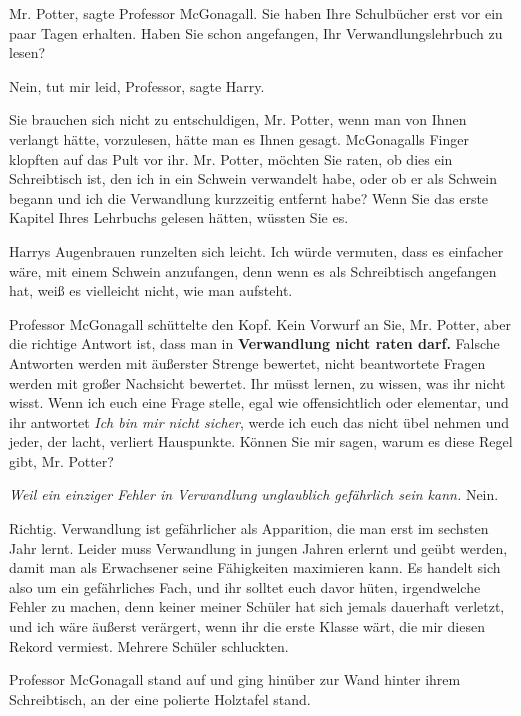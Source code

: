 \glqq{}Mr. Potter\grqq{}, sagte Professor McGonagall. \glqq{}Sie haben Ihre
Schulbücher erst vor ein paar Tagen erhalten. Haben Sie schon angefangen, Ihr
Verwandlungslehrbuch zu lesen?\grqq{}

\glqq{}Nein, tut mir leid, Professor\grqq{}, sagte Harry.

\glqq{}Sie brauchen sich nicht zu entschuldigen, Mr. Potter, wenn man von Ihnen
verlangt hätte, vorzulesen, hätte man es Ihnen gesagt.\grqq{} McGonagalls Finger
klopften auf das Pult vor ihr. \glqq{}Mr. Potter, möchten Sie raten, ob dies ein
Schreibtisch ist, den ich in ein Schwein verwandelt habe, oder ob er als Schwein
begann und ich die Verwandlung kurzzeitig entfernt habe? Wenn Sie das erste
Kapitel Ihres Lehrbuchs gelesen hätten, wüssten Sie es.\grqq{}

Harrys Augenbrauen runzelten sich leicht. \glqq{}Ich würde vermuten, dass es
einfacher wäre, mit einem Schwein anzufangen, denn wenn es als Schreibtisch
angefangen hat, weiß es vielleicht nicht, wie man aufsteht.\grqq{}

Professor McGonagall schüttelte den Kopf. \glqq{}Kein Vorwurf an Sie, Mr. Potter,
aber die richtige Antwort ist, dass man in \textbf{Verwandlung nicht raten
darf.} Falsche Antworten werden mit äußerster Strenge bewertet, nicht
beantwortete Fragen werden mit großer Nachsicht bewertet. Ihr müsst lernen, zu
wissen, was ihr nicht wisst. Wenn ich euch eine Frage stelle, egal wie
offensichtlich oder elementar, und ihr antwortet \emph{\glqq{}Ich bin mir nicht
sicher\grqq{}}, werde ich euch das nicht übel nehmen und jeder, der lacht,
verliert Hauspunkte. Können Sie mir sagen, warum es diese Regel gibt, Mr.
Potter?\grqq{}

\emph{Weil ein einziger Fehler in Verwandlung unglaublich gefährlich sein kann.}
\glqq{}Nein.\grqq{}

\glqq{}Richtig. Verwandlung ist gefährlicher als Apparition, die man erst im
sechsten Jahr lernt. Leider muss Verwandlung in jungen Jahren erlernt und geübt
werden, damit man als Erwachsener seine Fähigkeiten maximieren kann. Es handelt
sich also um ein gefährliches Fach, und ihr solltet euch davor hüten,
irgendwelche Fehler zu machen, denn keiner meiner Schüler hat sich jemals
dauerhaft verletzt, und ich wäre äußerst verärgert, wenn ihr die erste Klasse
wärt, die mir diesen Rekord vermiest.\grqq{} Mehrere Schüler schluckten.

Professor McGonagall stand auf und ging hinüber zur Wand hinter ihrem
Schreibtisch, an der eine polierte Holztafel stand.

